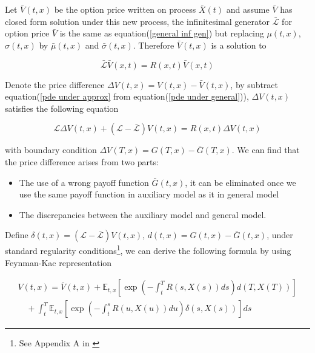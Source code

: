 Let $\bar{V}(t,x)$ be the option price written on process $\bar{X}(t)$ and assume $\bar{V}$ has closed form solution under this new process, the infinitesimal generator $\bar{\mathcal{L}}$ for option price $\bar{V}$ is the same as equation(\ref{general inf gen}) but replacing $\mu(t,x)$, $\sigma(t,x)$ by $\bar{\mu}(t,x)$ and $\bar{\sigma}(t,x)$. Therefore $\bar{V}(t,x)$ is a solution to

\begin{equation}\label{pde under approx}
    \mathcal{\bar{L}}\bar{V}(x,t) = R(x,t)\bar{V}(x,t)
\end{equation}



Denote the price difference $\Delta V(t,x) = V(t,x) - \bar{V}(t,x)$, by subtract equation(\ref{pde under approx} from equation(\ref{pde under general})), $\Delta V(t,x)$ satisfies the following equation

\begin{equation}
    \mathcal{L} \Delta V(t, x)+ (\mathcal{L}-\bar{\mathcal{L}}) V(t,x)=R(x, t) \Delta V(t, x)
\end{equation}

\noindent with boundary condition $\Delta V(T,x) = G(T,x) - \bar{G}(T,x)$. We can find that the price difference arises from two parts:

\begin{itemize}
    \item The use of a wrong payoff function $\bar{G}(t,x)$, it can be eliminated once we use the same payoff function in auxiliary model as it in general model
    \item The discrepancies between the auxiliary model and general model.
\end{itemize}

\noindent Define $\delta(t,x) = (\mathcal{L}-\bar{\mathcal{L}}) V(t,x)$, $d(t,x) = G(t,x) - \bar{G}(t,x)$, under standard regularity conditions\footnote{See Appendix A in \cite{kristensen_adding_2011}}, we can derive the following formula by using Feynman-Kac representation

\begin{equation}\label{feynman-kac rep}
    \begin{gathered}
        V(t, x)=\bar{V}(t,x)+\mathbb{E}_{t,x}\left[\exp \left(-\int_{t}^{T} R(s,X(s)) d s\right) d(T,X(T))\right] \\
        \quad+\int_{t}^{T} \mathbb{E}_{t,x}\left[\exp \left(-\int_{t}^{s} R(u, X(u)) d u\right) \delta(s,X(s))\right] d s
        \end{gathered}
\end{equation}

